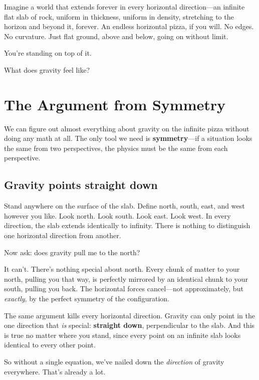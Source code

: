 \documentclass[11pt, letterpaper]{article}
\begin{document}
Imagine a world that extends forever in every horizontal direction---an infinite flat slab of rock, uniform in thickness, uniform in density, stretching to the horizon and beyond it, forever. An endless horizontal pizza, if you will. No edges. No curvature. Just flat ground, above and below, going on without limit.

You're standing on top of it.

What does gravity feel like?


\section{The Argument from Symmetry}

We can figure out almost everything about gravity on the infinite pizza without doing any math at all. The only tool we need is \textbf{symmetry}---if a situation looks the same from two perspectives, the physics must be the same from each perspective.

\subsection{Gravity points straight down}

Stand anywhere on the surface of the slab. Define north, south, east, and west however you like. Look north. Look south. Look east. Look west. In every direction, the slab extends identically to infinity. There is nothing to distinguish one horizontal direction from another.

Now ask: does gravity pull me to the north?

It can't. There's nothing special about north. Every chunk of matter to your north, pulling you that way, is perfectly mirrored by an identical chunk to your south, pulling you back. The horizontal forces cancel---not approximately, but \textit{exactly}, by the perfect symmetry of the configuration.

The same argument kills every horizontal direction. Gravity can only point in the one direction that \textit{is} special: \textbf{straight down}, perpendicular to the slab. And this is true no matter where you stand, since every point on an infinite slab looks identical to every other point.

So without a single equation, we've nailed down the \textit{direction} of gravity everywhere. That's already a lot.
\end{document}
